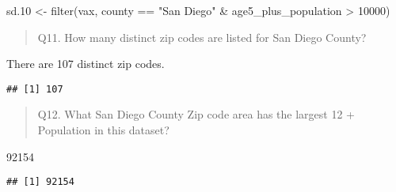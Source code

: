 \documentclass[
]{article}
\newenvironment{Shaded}{\begin{snugshade}}{\end{snugshade}}
\newcommand{\CommentTok}[1]{\textcolor[rgb]{0.56,0.35,0.01}{\textit{#1}}}
\newcommand{\DecValTok}[1]{\textcolor[rgb]{0.00,0.00,0.81}{#1}}
\newcommand{\FloatTok}[1]{\textcolor[rgb]{0.00,0.00,0.81}{#1}}
\newcommand{\FunctionTok}[1]{\textcolor[rgb]{0.00,0.00,0.00}{#1}}
\newcommand{\NormalTok}[1]{#1}
\newcommand{\OtherTok}[1]{\textcolor[rgb]{0.56,0.35,0.01}{#1}}
\newcommand{\SpecialCharTok}[1]{\textcolor[rgb]{0.00,0.00,0.00}{#1}}
\newcommand{\StringTok}[1]{\textcolor[rgb]{0.31,0.60,0.02}{#1}}
\begin{document}
\begin{Shaded}
\begin{Highlighting}[]
\NormalTok{sd}\FloatTok{.10} \OtherTok{\textless{}{-}} \FunctionTok{filter}\NormalTok{(vax, county }\SpecialCharTok{==} \StringTok{"San Diego"} \SpecialCharTok{\&}
\NormalTok{                age5\_plus\_population }\SpecialCharTok{\textgreater{}} \DecValTok{10000}\NormalTok{)}
\end{Highlighting}
\end{Shaded}

\begin{quote}
Q11. How many distinct zip codes are listed for San Diego County?
\end{quote}

There are 107 distinct zip codes.

\begin{Shaded}
\end{Shaded}

\begin{verbatim}
## [1] 107
\end{verbatim}

\begin{quote}
Q12. What San Diego County Zip code area has the largest 12 + Population
in this dataset?
\end{quote}

92154

\begin{Shaded}
\end{Shaded}

\begin{verbatim}
## [1] 92154
\end{verbatim}
\end{document}
